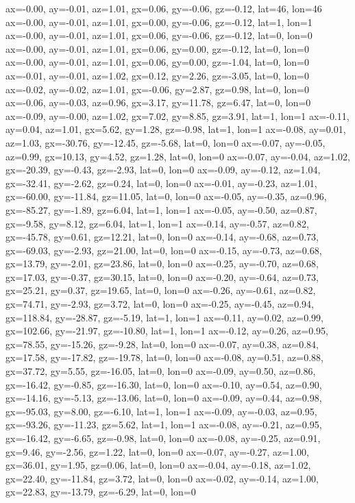 ax=-0.00, ay=-0.01, az=1.01, gx=0.06, gy=-0.06, gz=-0.12, lat=46, lon=46
ax=-0.00, ay=-0.01, az=1.01, gx=0.00, gy=-0.06, gz=-0.12, lat=1, lon=1
ax=-0.00, ay=-0.01, az=1.01, gx=0.06, gy=-0.06, gz=-0.12, lat=0, lon=0
ax=-0.00, ay=-0.01, az=1.01, gx=0.06, gy=0.00, gz=-0.12, lat=0, lon=0
ax=-0.00, ay=-0.01, az=1.01, gx=0.06, gy=0.00, gz=-1.04, lat=0, lon=0
ax=-0.01, ay=-0.01, az=1.02, gx=0.12, gy=2.26, gz=-3.05, lat=0, lon=0
ax=-0.02, ay=-0.02, az=1.01, gx=-0.06, gy=2.87, gz=0.98, lat=0, lon=0
ax=-0.06, ay=-0.03, az=0.96, gx=3.17, gy=11.78, gz=6.47, lat=0, lon=0
ax=-0.09, ay=-0.00, az=1.02, gx=7.02, gy=8.85, gz=3.91, lat=1, lon=1
ax=-0.11, ay=0.04, az=1.01, gx=5.62, gy=1.28, gz=-0.98, lat=1, lon=1
ax=-0.08, ay=0.01, az=1.03, gx=-30.76, gy=-12.45, gz=-5.68, lat=0, lon=0
ax=-0.07, ay=-0.05, az=0.99, gx=10.13, gy=4.52, gz=1.28, lat=0, lon=0
ax=-0.07, ay=-0.04, az=1.02, gx=-20.39, gy=-0.43, gz=-2.93, lat=0, lon=0
ax=-0.09, ay=-0.12, az=1.04, gx=-32.41, gy=-2.62, gz=0.24, lat=0, lon=0
ax=-0.01, ay=-0.23, az=1.01, gx=-60.00, gy=-11.84, gz=11.05, lat=0, lon=0
ax=-0.05, ay=-0.35, az=0.96, gx=-85.27, gy=-1.89, gz=6.04, lat=1, lon=1
ax=-0.05, ay=-0.50, az=0.87, gx=-9.58, gy=8.12, gz=6.04, lat=1, lon=1
ax=-0.14, ay=-0.57, az=0.82, gx=-45.78, gy=0.61, gz=12.21, lat=0, lon=0
ax=-0.14, ay=-0.68, az=0.73, gx=-69.03, gy=-2.93, gz=21.00, lat=0, lon=0
ax=-0.15, ay=-0.73, az=0.68, gx=13.79, gy=-2.01, gz=23.86, lat=0, lon=0
ax=-0.25, ay=-0.70, az=0.68, gx=17.03, gy=-0.37, gz=30.15, lat=0, lon=0
ax=-0.20, ay=-0.64, az=0.73, gx=25.21, gy=0.37, gz=19.65, lat=0, lon=0
ax=-0.26, ay=-0.61, az=0.82, gx=74.71, gy=-2.93, gz=3.72, lat=0, lon=0
ax=-0.25, ay=-0.45, az=0.94, gx=118.84, gy=-28.87, gz=-5.19, lat=1, lon=1
ax=-0.11, ay=0.02, az=0.99, gx=102.66, gy=-21.97, gz=-10.80, lat=1, lon=1
ax=-0.12, ay=0.26, az=0.95, gx=78.55, gy=-15.26, gz=-9.28, lat=0, lon=0
ax=-0.07, ay=0.38, az=0.84, gx=17.58, gy=-17.82, gz=-19.78, lat=0, lon=0
ax=-0.08, ay=0.51, az=0.88, gx=37.72, gy=5.55, gz=-16.05, lat=0, lon=0
ax=-0.09, ay=0.50, az=0.86, gx=-16.42, gy=-0.85, gz=-16.30, lat=0, lon=0
ax=-0.10, ay=0.54, az=0.90, gx=-14.16, gy=-5.13, gz=-13.06, lat=0, lon=0
ax=-0.09, ay=0.44, az=0.98, gx=-95.03, gy=8.00, gz=-6.10, lat=1, lon=1
ax=-0.09, ay=-0.03, az=0.95, gx=-93.26, gy=-11.23, gz=5.62, lat=1, lon=1
ax=-0.08, ay=-0.21, az=0.95, gx=-16.42, gy=-6.65, gz=-0.98, lat=0, lon=0
ax=-0.08, ay=-0.25, az=0.91, gx=9.46, gy=-2.56, gz=1.22, lat=0, lon=0
ax=-0.07, ay=-0.27, az=1.00, gx=36.01, gy=1.95, gz=0.06, lat=0, lon=0
ax=-0.04, ay=-0.18, az=1.02, gx=22.40, gy=-11.84, gz=3.72, lat=0, lon=0
ax=-0.02, ay=-0.14, az=1.00, gx=22.83, gy=-13.79, gz=-6.29, lat=0, lon=0
